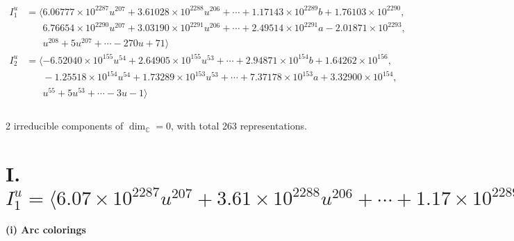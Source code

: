 \documentclass[1p]{elsarticle_modified}
\theoremstyle{definition}
\begin{document}
\begin{align*}
I^u_{1}&=\langle 
6.06777\times10^{2287} u^{207}+3.61028\times10^{2288} u^{206}+\cdots+1.17143\times10^{2289} b+1.76103\times10^{2290},\\
\phantom{I^u_{1}}&\phantom{= \langle  }6.76654\times10^{2290} u^{207}+3.03190\times10^{2291} u^{206}+\cdots+2.49514\times10^{2291} a-2.01871\times10^{2293},\\
\phantom{I^u_{1}}&\phantom{= \langle  }u^{208}+5 u^{207}+\cdots-270 u+71\rangle \\
I^u_{2}&=\langle 
-6.52040\times10^{155} u^{54}+2.64905\times10^{155} u^{53}+\cdots+2.94871\times10^{154} b+1.64262\times10^{156},\\
\phantom{I^u_{2}}&\phantom{= \langle  }-1.25518\times10^{154} u^{54}+1.73289\times10^{153} u^{53}+\cdots+7.37178\times10^{153} a+3.32900\times10^{154},\\
\phantom{I^u_{2}}&\phantom{= \langle  }u^{55}+5 u^{53}+\cdots-3 u-1\rangle \\
\\
\end{align*}
\raggedright * 2 irreducible components of $\dim_{\mathbb{C}}=0$, with total 263 representations.\\
\newpage
\renewcommand{\arraystretch}{1}
\centering \section*{I. $I^u_{1}= \langle 6.07\times10^{2287} u^{207}+3.61\times10^{2288} u^{206}+\cdots+1.17\times10^{2289} b+1.76\times10^{2290},\;6.77\times10^{2290} u^{207}+3.03\times10^{2291} u^{206}+\cdots+2.50\times10^{2291} a-2.02\times10^{2293},\;u^{208}+5 u^{207}+\cdots-270 u+71 \rangle$}
\flushleft \textbf{(i) Arc colorings}\\
\end{document}
